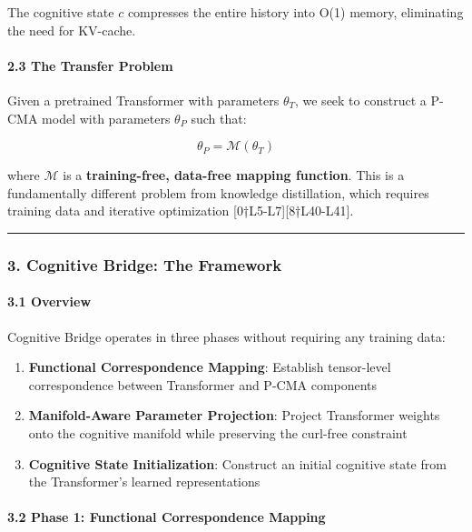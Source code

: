 \documentclass[
  11pt,
  a4paper,
]{article}
\providecommand{\tightlist}{%
  \setlength{\itemsep}{0pt}\setlength{\parskip}{0pt}}
\begin{document}
The cognitive state \(c\) compresses the entire history into O(1)
memory, eliminating the need for KV-cache.

\paragraph{2.3 The Transfer Problem}\label{the-transfer-problem}

Given a pretrained Transformer with parameters \(\theta_T\), we seek to
construct a P-CMA model with parameters \(\theta_P\) such that:

\[
\theta_P = \mathcal{M}(\theta_T)
\]

where \(\mathcal{M}\) is a \textbf{training-free, data-free mapping
function}. This is a fundamentally different problem from knowledge
distillation, which requires training data and iterative optimization
{[}0†L5-L7{]}{[}8†L40-L41{]}.

\begin{center}\rule{0.5\linewidth}{0.5pt}\end{center}

\subsubsection{3. Cognitive Bridge: The
Framework}\label{cognitive-bridge-the-framework}

\paragraph{3.1 Overview}\label{overview-2}

Cognitive Bridge operates in three phases without requiring any training
data:

\begin{enumerate}
\def\labelenumi{\arabic{enumi}.}
\tightlist
\item
  \textbf{Functional Correspondence Mapping}: Establish tensor-level
  correspondence between Transformer and P-CMA components
\item
  \textbf{Manifold-Aware Parameter Projection}: Project Transformer
  weights onto the cognitive manifold while preserving the curl-free
  constraint
\item
  \textbf{Cognitive State Initialization}: Construct an initial
  cognitive state from the Transformer's learned representations
\end{enumerate}

\paragraph{3.2 Phase 1: Functional Correspondence
Mapping}\label{phase-1-functional-correspondence-mapping}
\end{document}
